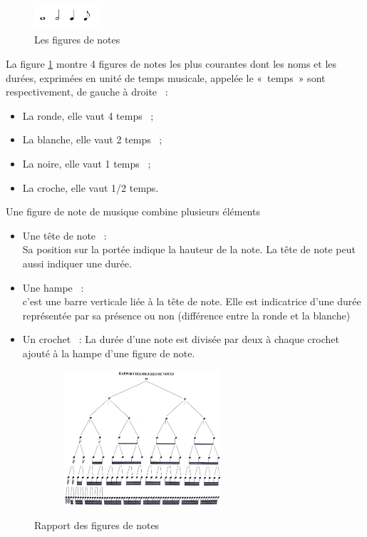 \begin{figure}[h]
	\centering
	\includegraphics[height=10mm, width=25mm]{
    z_images/3_methodes/0_notation_de_la_batterie/0_figures_de_notes.png}
    \caption{Les figures de notes}
    \label{4_notes}
\end{figure}
La figure \ref{4_notes} montre 4 figures de notes les plus courantes dont les
noms et les durées, exprimées en unité de temps musicale, appelée le «~temps~»
sont respectivement, de gauche à droite~ :
\begin{itemize}
    \item La ronde, elle vaut 4 temps~ ;
    \item La blanche, elle vaut 2 temps~ ;
    \item La noire, elle vaut 1 temps~ ;
    \item La croche, elle vaut 1/2 temps.
\end{itemize}
Une figure de note \cite{danhauser} de musique combine plusieurs éléments
\cite{gould2016behind}
\begin{itemize}
	\item Une tête de note~ :\\
	Sa position sur la portée indique la hauteur de la note. La tête de note
    peut aussi indiquer une durée.
	\item Une hampe~ :\\
	c’est une barre verticale liée à la tête de note. Elle est indicatrice
    d’une durée représentée par sa présence ou non (différence entre la ronde
    et la blanche)
	\item Un crochet~ : La durée d’une note est divisée par deux à chaque
     crochet ajouté à la hampe d’une figure de note.\\
\end{itemize}
\begin{figure}[h]
	\centering
	\includegraphics[height=50mm, width=80mm]{
    z_images/3_methodes/0_notation_de_la_batterie/1_rapport_figures_notes.png}
	\caption{Rapport des figures de notes}\cite{danhauser}
	\label{rapp_fig_notes}
\end{figure}

